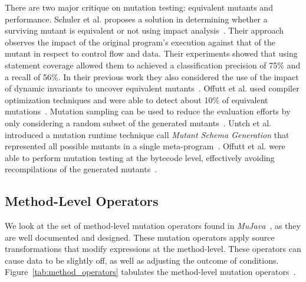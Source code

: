 There are two major critique on mutation testing: equivalent mutants and performance. Schuler et al. proposes a solution in determining whether a surviving mutant is equivalent or not using impact analysis~\cite{SZ10}. Their approach observes the impact of the original program's execution against that of the mutant in respect to control flow and data. Their experiments showed that using statement coverage allowed them to achieved a classification precision of 75\% and a recall of 56\%. In their previous work they also considered the use of the impact of dynamic invariants to uncover equivalent mutants~\cite{SDZ09}. Offutt et al. used compiler optimization techniques and were able to detect about 10\% of equivalent mutations~\cite{OC94}. Mutation sampling can be used to reduce the evaluation efforts by only considering a random subset of the generated mutants~\cite{Bud80}. Untch et al. introduced a mutation runtime technique call \emph{Mutant Schema Generation} that represented all possible mutants in a single meta-program~\cite{UOH93}. Offutt et al. were able to perform mutation testing at the bytecode level, effectively avoiding recompilations of the generated mutants~\cite{OMK04}.


\subsection{Method-Level Operators}
\label{subsec:background_method_operators}
We look at the set of method-level mutation operators found in \emph{MuJava}~\cite{MOK05}, as they are well documented and designed. These mutation operators apply source transformations that modify expressions at the method-level. These operators can cause data to be slightly off, as well as adjusting the outcome of conditions. Figure~\ref{tab:method_operators} tabulates the method-level mutation operators~\cite{MO05a}.

